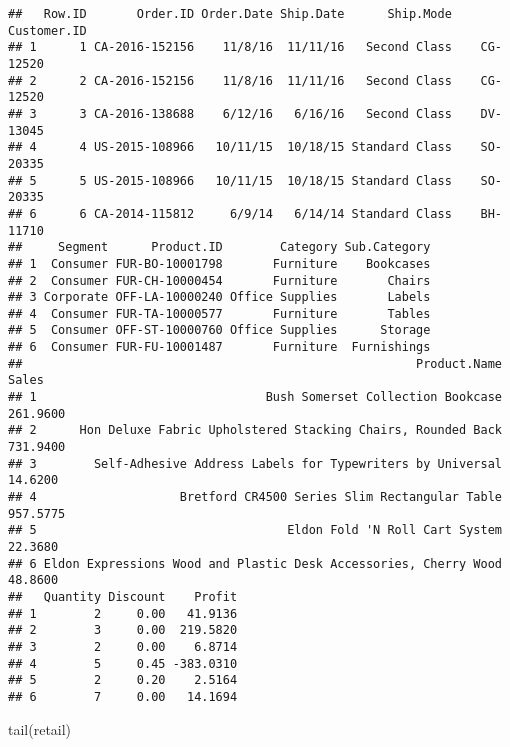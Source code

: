 \documentclass[
]{article}
\newenvironment{Shaded}{\begin{snugshade}}{\end{snugshade}}
\newcommand{\FunctionTok}[1]{\textcolor[rgb]{0.00,0.00,0.00}{#1}}
\newcommand{\NormalTok}[1]{#1}
\begin{document}
\begin{verbatim}
##   Row.ID       Order.ID Order.Date Ship.Date      Ship.Mode Customer.ID
## 1      1 CA-2016-152156    11/8/16  11/11/16   Second Class    CG-12520
## 2      2 CA-2016-152156    11/8/16  11/11/16   Second Class    CG-12520
## 3      3 CA-2016-138688    6/12/16   6/16/16   Second Class    DV-13045
## 4      4 US-2015-108966   10/11/15  10/18/15 Standard Class    SO-20335
## 5      5 US-2015-108966   10/11/15  10/18/15 Standard Class    SO-20335
## 6      6 CA-2014-115812     6/9/14   6/14/14 Standard Class    BH-11710
##     Segment      Product.ID        Category Sub.Category
## 1  Consumer FUR-BO-10001798       Furniture    Bookcases
## 2  Consumer FUR-CH-10000454       Furniture       Chairs
## 3 Corporate OFF-LA-10000240 Office Supplies       Labels
## 4  Consumer FUR-TA-10000577       Furniture       Tables
## 5  Consumer OFF-ST-10000760 Office Supplies      Storage
## 6  Consumer FUR-FU-10001487       Furniture  Furnishings
##                                                       Product.Name    Sales
## 1                                Bush Somerset Collection Bookcase 261.9600
## 2      Hon Deluxe Fabric Upholstered Stacking Chairs, Rounded Back 731.9400
## 3        Self-Adhesive Address Labels for Typewriters by Universal  14.6200
## 4                    Bretford CR4500 Series Slim Rectangular Table 957.5775
## 5                                   Eldon Fold 'N Roll Cart System  22.3680
## 6 Eldon Expressions Wood and Plastic Desk Accessories, Cherry Wood  48.8600
##   Quantity Discount    Profit
## 1        2     0.00   41.9136
## 2        3     0.00  219.5820
## 3        2     0.00    6.8714
## 4        5     0.45 -383.0310
## 5        2     0.20    2.5164
## 6        7     0.00   14.1694
\end{verbatim}

\begin{Shaded}
\begin{Highlighting}[]
\FunctionTok{tail}\NormalTok{(retail)}
\end{Highlighting}
\end{Shaded}
\end{document}
